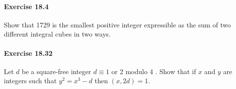 \documentclass{article}
\begin{document}
\paragraph{Exercise 18.4} Show that 1729 is the smallest positive integer expressible as the sum of two different integral cubes in two ways.

\paragraph{Exercise 18.32} Let $d$ be a square-free integer $d \equiv 1$ or 2 modulo 4 . Show that if $x$ and $y$ are integers such that $y^{2}=x^{3}-d$ then $(x, 2 d)=1$.
\end{document}
